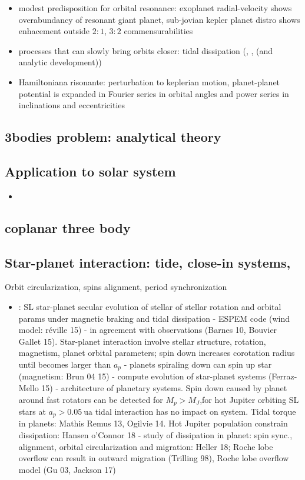 \documentclass[main.tex]{subfiles}
\begin{document}
\begin{itemize}
\item modest predisposition for orbital resonance: exoplanet radial-velocity shows overabundancy of resonant giant planet, sub-jovian kepler planet distro shows enhacement outside $2:1$, $3:2$ commensurabilities
\item processes that can slowly bring orbits closer: tidal dissipation (\cite{goldreich1966q}, \cite{yoder1981tides}, \cite{peale1976orbital} (and analytic development))    
\item Hamiltoniana risonante: perturbation to keplerian motion, planet-planet potential is expanded in Fourier series in orbital angles and power series in inclinations and eccentricities
\end{itemize}

\subsection{3bodies problem: analytical theory}

\subsection{Application to solar system}
\begin{itemize}
    \item 
\end{itemize}
\subsection{coplanar three body}

\subsection{Star-planet interaction: tide, close-in systems, }
Orbit circularization, spins alignment, period synchronization
\begin{itemize}
    \item \cite{benbakoura2019evolution}: SL star-planet secular evolution of stellar of stellar rotation and orbital params under magnetic braking and tidal dissipation - ESPEM code (wind model: r\'eville 15) - in agreement with observations (Barnes 10, Bouvier Gallet 15). Star-planet interaction involve stellar structure, rotation, magnetism, planet orbital parameters; spin down increases corotation radius until becomes larger than $a_p$ - planets spiraling down can spin up star (magnetism: Brun 04 15) - compute evolution of star-planet systems (Ferraz-Mello 15) - architecture of planetary systems. Spin down caused by planet around fast rotators can be detected for $M_p>M_J$,for hot Jupiter orbiting SL stars at $a_p>\SI{0.05}{\astronomicalunit}$ tidal interaction has no impact on system. Tidal torque in planets: Mathis Remus 13, Ogilvie 14. Hot Jupiter population constrain dissipation: Hansen o'Connor 18 - study of dissipation in planet: spin sync., alignment, orbital circularization and migration: Heller 18; Roche lobe overflow can result in outward migration (Trilling 98), Roche lobe overflow model (Gu 03, Jackson 17)
\end{itemize}
\end{document}
